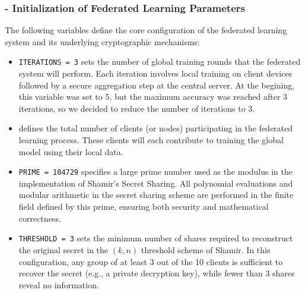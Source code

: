 \documentclass[10pt]{article}
\begin{document}
\subsubsection*{- Initialization of Federated Learning Parameters}
The following variables define the core configuration of the federated learning system and its underlying cryptographic mechanisms:
\begin{itemize}
	\item \texttt{ITERATIONS = 3} sets the number of global training rounds that the federated system will perform. Each iteration involves local training on client devices followed by a secure aggregation step at the central server. At the begining, this variable was set to 5, but the maximum accuracy was reached after 3 iterations, so we decided to reduce the number of iterations to 3.
	\item \texttt{} defines the total number of clients (or nodes) participating in the federated learning process. These clients will each contribute to training the global model using their local data.
	\item \texttt{PRIME = 104729} specifies a large prime number used as the modulus in the implementation of Shamir’s Secret Sharing. All polynomial evaluations and modular arithmetic in the secret sharing scheme are performed in the finite field defined by this prime, ensuring both security and mathematical correctness.
	\item \texttt{THRESHOLD = 3} sets the minimum number of shares required to reconstruct the original secret in the $(k, n)$ threshold scheme of Shamir. In this configuration, any group of at least 3 out of the 10 clients is sufficient to recover the secret (e.g., a private decryption key), while fewer than 3 shares reveal no information.
\end{itemize}
\end{document}
